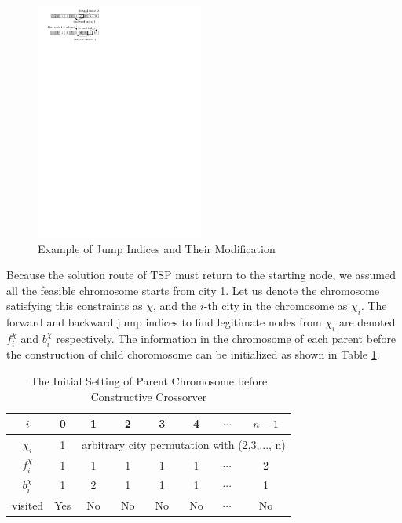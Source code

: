 \begin{figure}
\centering
\includegraphics[width=5.5cm]{jumpIndices.pdf}
\caption{Example of Jump Indices and Their Modification}
\label{fig:jumpIndices}
\end{figure}

Because the solution route of TSP must return to the starting node, we assumed all the feasible chromosome starts from city 1. Let us denote the chromosome satisfying this constraints as $\chi$, and the $i$-th city in the chromosome as $\chi_i$. The forward and backward jump indices to find legitimate nodes from $\chi_i$ are denoted $f_i^{\chi}$ and $b_i^{\chi}$ respectively. The information in the chromosome of each parent before the construction of child choromosome can be initialized as shown in Table \ref{tab:initChoromosome}.

\begin{table}
\caption{The Initial Setting of Parent Chromosome before Constructive Crossorver}
\label{tab:initChoromosome}
\begin{center}
\begin{tabular}{|c|c|c|c|c|c|c|c|}\hline
$i$  & 0 & 1 & 2 & 3 & 4 & $\cdots$ & $n-1$\\ \hline
$\chi_i$ & 1 &  \multicolumn{6}{|c|}{arbitrary city permutation with (2,3,..., n) }\\ \hline
$f_i^{\chi}$  & 1 & 1 & 1 & 1 & 1 & $\cdots$ & 2\\ \hline
$b_i^{\chi}$  & 1 & 2 & 1 & 1 & 1 & $\cdots$ & 1\\ \hline
visited & Yes & No & No & No & No & $\cdots$ & No\\ \hline
\end{tabular}
\end{center}
\end{table}

